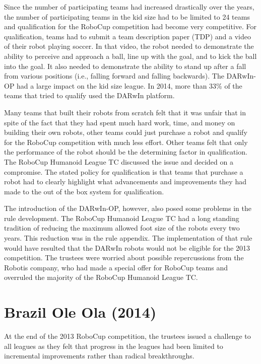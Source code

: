 \documentclass{llncs}
\begin{document}
Since the number of participating teams had increased drastically over
the years, the number of participating teams in the kid size had to be
limited to 24 teams and qualification for the RoboCup competition had
become very competitive. For qualification, teams had to submit a team
description paper (TDP) and a video of their robot playing soccer. In
that video, the robot needed to demonstrate the ability to perceive
and approach a ball, line up with the goal, and to kick the ball into
the goal. It also needed to demonstrate the ability to stand up after
a fall from various positions (i.e., falling forward and falling
backwards). The DARwIn-OP had a large impact on the kid size
league. In 2014, more than 33\% of the teams that tried to qualify
used the DARwIn platform.

Many teams that built their robots from scratch felt that it was
unfair that in spite of the fact that they had spent much hard work,
time, and money on building their own robots, other teams could just
purchase a robot and qualify for the RoboCup competition with much
less effort. Other teams felt that only the performance of the robot
should be the determining factor in qualification. The RoboCup
Humanoid League TC discussed the issue and decided on a
compromise. The stated policy for qualification is that teams that
purchase a robot had to clearly highlight what advancements and
improvements they had made to the out of the box system for
qualification.

The introduction of the DARwIn-OP, however, also posed some problems
in the rule development. The RoboCup Humanoid League TC had a long
standing tradition of reducing the maximum allowed foot size of the
robots every two years. This reduction was in the rule appendix. The
implementation of that rule would have resulted that the DARwIn robots
would not be eligible for the 2013 competition. The trustees were
worried about possible repercussions from the Robotis company, who had
made a special offer for RoboCup teams and overruled the majority of
the RoboCup Humanoid League TC.

\section{Brazil Ole Ola (2014)}
\label{sec:four}

At the end of the 2013 RoboCup competition, the trustees issued a
challenge to all leagues as they felt that progress in the leagues had
been limited to incremental improvements rather than radical
breakthroughs.
\end{document}

